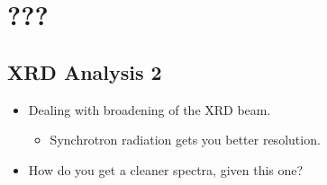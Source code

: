 \documentclass[../notes.tex]{subfiles}
\begin{document}
\chapter{???}
\section{XRD Analysis 2}
\begin{itemize}
    \item {}Dealing with broadening of the XRD beam.
    \begin{itemize}
        \item Synchrotron radiation gets you better resolution.
    \end{itemize}
    \item How do you get a cleaner spectra, given this one?
    \begin{figure}[h!]
        \centering
\end{figure}
\end{itemize}
\end{document}
